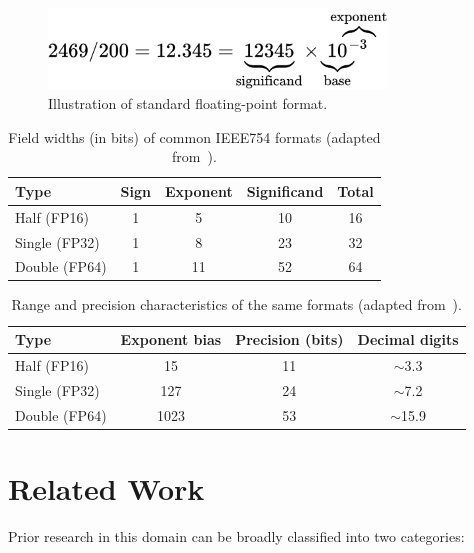 \documentclass[11pt]{article}
\begin{document}
\begin{figure}[H]
	\centering
	\includegraphics[width=0.8\textwidth]{figures/float.png}
	\caption{Illustration of standard floating-point format.}\label{fig:floatingPointFormat}
\end{figure}

\begin{table}[H]
	\centering
	\begin{tabular}{@{}lcccc@{}}
		\toprule
		\textbf{Type} & Sign & Exponent & Significand & Total \\
		\midrule
		Half  (FP16)  & 1    & 5        & 10          & 16    \\
		Single (FP32) & 1    & 8        & 23          & 32    \\
		Double (FP64) & 1    & 11       & 52          & 64    \\
		\bottomrule
	\end{tabular}
	\caption{Field widths (in bits) of common IEEE754 formats (adapted from~\cite{fparithmetic}).}\label{tab:binary-bits}
\end{table}

\begin{table}[H]
	\centering
	\begin{tabular}{@{}lccc@{}}
		\toprule
		\textbf{Type} & Exponent bias & Precision (bits) & Decimal digits \\
		\midrule
		Half  (FP16)  & 15            & 11               & $\sim$3.3      \\
		Single (FP32) & 127           & 24               & $\sim$7.2      \\
		Double (FP64) & 1023          & 53               & $\sim$15.9     \\
		\bottomrule
	\end{tabular}
	\caption{Range and precision characteristics of the same formats (adapted from~\cite{fparithmetic}).}\label{tab:binary-precision}
\end{table}

\section{Related Work}

Prior research in this domain can be broadly classified into two categories:
\end{document}
